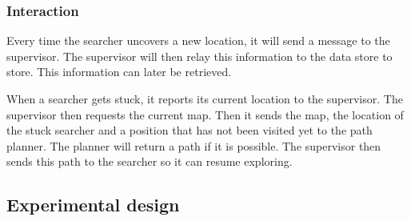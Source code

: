 \subsubsection{Interaction}
Every time the searcher uncovers a new location, it will send a message to
the supervisor. The supervisor will then relay this information to the data
store to store. This information can later be retrieved.

When a searcher gets stuck, it reports its current location to the
supervisor. The supervisor then requests the current map. Then it sends the
map, the location of the stuck searcher and a position that has not been
visited yet to the path planner. The planner will return a path if it is
possible. The supervisor then sends this path to the searcher so it can
resume exploring.

\subsection{Experimental design}
